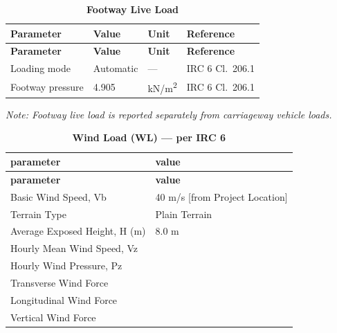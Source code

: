 \documentclass[12pt,a4paper]{report}
\numberwithin{table}{chapter}
\numberwithin{figure}{chapter}
\begin{document}
\vspace{1em}
\begin{longtable}{|L{5.5cm}|C{3.0cm}|C{2.5cm}|L{4.0cm}|}
\caption{\textbf{Footway Live Load}}
\hline
{} \textbf{Parameter} & \textbf{Value} & \textbf{Unit} & \textbf{Reference} \\[6pt]
\hline
\endfirsthead
\hline
{} \textbf{Parameter} & \textbf{Value} & \textbf{Unit} & \textbf{Reference} \\[6pt]
\hline
\endhead

\textnormal{Loading mode} & Automatic & --- & IRC 6 Cl.\ 206.1 \\[6pt]
\hline
\textnormal{Footway pressure} & 4.905 & kN/m\textsuperscript{2} & IRC 6 Cl.\ 206.1 \\[6pt]
\hline
\end{longtable}
\noindent\textit{Note: Footway live load is reported separately from carriageway vehicle loads.}

\vspace{1em}
\begin{longtable}{|L{5.5cm}|p{10.0cm}|}
\caption{\textbf{Wind Load (WL) --- per IRC 6}}
\hline
{} \textbf{parameter} & \textbf{value} \\
\hline
\endfirsthead
\hline
{} \textbf{parameter} & \textbf{value} \\
\hline
\endhead
\textnormal{Basic Wind Speed, Vb} & 40 m/s [from Project Location] \\[6pt]
\hline
\textnormal{Terrain Type} & Plain Terrain \\[6pt]
\hline
\textnormal{Average Exposed Height, H (m)} & 8.0 m \\[6pt]
\hline
\textnormal{Hourly Mean Wind Speed, Vz} &  \\[6pt]
\hline
\textnormal{Hourly Wind Pressure, Pz} &  \\[6pt]
\hline
\textnormal{Transverse Wind Force} &  \\[6pt]
\hline
\textnormal{Longitudinal Wind Force} &  \\[6pt]
\hline
\textnormal{Vertical Wind Force} &  \\[6pt]
\hline
\end{longtable}
\end{document}
